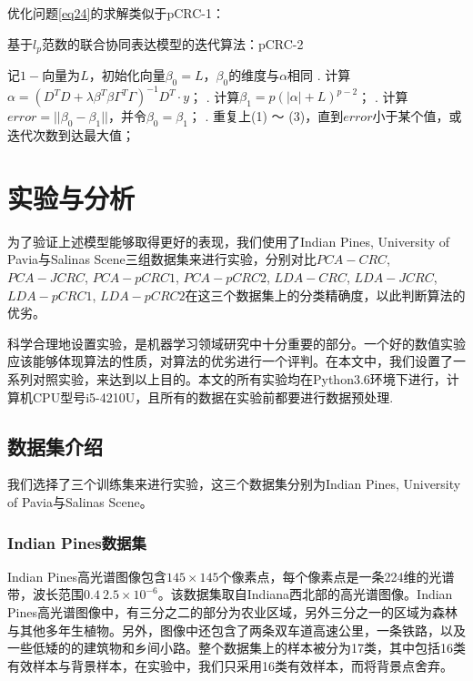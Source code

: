 \documentclass[12pt,a4paper]{article}
\begin{document}
优化问题\eqref{eq24}的求解类似于pCRC-1：
\begin{algorithm}[H] 
	\caption{基于$l_{p}$范数的联合协同表达模型的迭代算法：pCRC-2}  
	\label{alg:pCRC-2}  
	\begin{algorithmic}
		\STATE 记$1-$向量为$L$，初始化向量$\beta_{0} = L$，$\beta_{0}$的维度与$\alpha$相同
		. 计算$\alpha = (D^{T}D + \lambda \beta^{T}\beta\Gamma^{T}\Gamma)^{-1}D^{T} \cdot y$；   
		. 计算$\beta_{1} = p(|\alpha| + L)^{p - 2}$；
		. 计算$error = ||\beta_{0} - \beta_{1}||$，并令$\beta_{0} = \beta_{1}$；
		. 重复上(1) ～ (3)，直到$error$小于某个值，或迭代次数到达最大值；
	\end{algorithmic}  
\end{algorithm}  

\section{实验与分析}
为了验证上述模型能够取得更好的表现，我们使用了Indian Pines, University of Pavia与Salinas Scene三组数据集来进行实验，分别对比$PCA-CRC$, $PCA-JCRC$, $PCA-pCRC1$, $PCA-pCRC2$, $LDA-CRC$, $LDA-JCRC$, $LDA-pCRC1$, $LDA-pCRC2$在这三个数据集上的分类精确度，以此判断算法的优劣。

科学合理地设置实验，是机器学习领域研究中十分重要的部分。一个好的数值实验应该能够体现算法的性质，对算法的优劣进行一个评判。在本文中，我们设置了一系列对照实验，来达到以上目的。本文的所有实验均在Python3.6环境下进行，计算机CPU型号i5-4210U，且所有的数据在实验前都要进行数据预处理.
\subsection{数据集介绍}
我们选择了三个训练集来进行实验，这三个数据集分别为Indian Pines, University of Pavia与Salinas Scene。
\subsubsection{Indian Pines数据集}
Indian Pines高光谱图像包含$145\times 145$个像素点，每个像素点是一条224维的光谱带，波长范围$0.4 ~ 2.5 \times 10^{-6}$。该数据集取自Indiana西北部的高光谱图像。Indian Pines高光谱图像中，有三分之二的部分为农业区域，另外三分之一的区域为森林与其他多年生植物。另外，图像中还包含了两条双车道高速公里，一条铁路，以及一些低矮的的建筑物和乡间小路。整个数据集上的样本被分为17类，其中包括16类有效样本与背景样本，在实验中，我们只采用16类有效样本，而将背景点舍弃。
\end{document}
